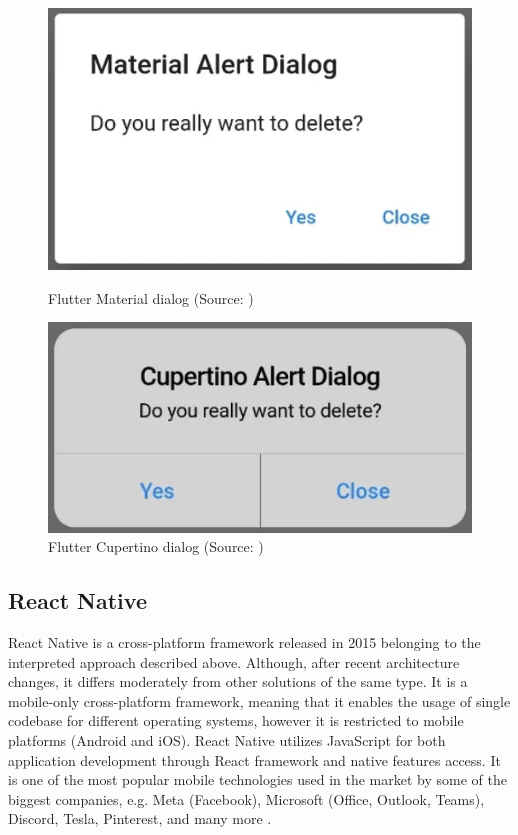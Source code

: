 \begin{figure}[h]
    \begin{minipage}{.45\textwidth}
        \includegraphics[width=\textwidth]{img/flutter_material_dialog}
        \caption{Flutter Material dialog (Source: \cite{flutter_campus_dialog})}
        \label{fig:flutter_material_dialog}
    \end{minipage}
    \hfill
    \begin{minipage}{.45\textwidth}
        \includegraphics[width=\textwidth]{img/flutter_cupertino_dialog}
        \caption{Flutter Cupertino dialog (Source: \cite{flutter_campus_dialog})}
        \label{fig:flutter_cupertino_dialog}
    \end{minipage}
\end{figure}

\subsection{React Native}

React Native is a cross-platform framework released in 2015 belonging to the interpreted approach described above. Although, after recent architecture changes, it differs moderately from other solutions of the same type. It is a mobile-only cross-platform framework, meaning that it enables the usage of single codebase for different operating systems, however it is restricted to mobile platforms (Android and iOS). React Native utilizes JavaScript for both application development through React framework and native features access. It is one of the most popular mobile technologies used in the market by some of the biggest companies, e.g. Meta (Facebook), Microsoft (Office, Outlook, Teams), Discord, Tesla, Pinterest, and many more \cite{react_native_showcase, react_native_docs_core_concepts}.

